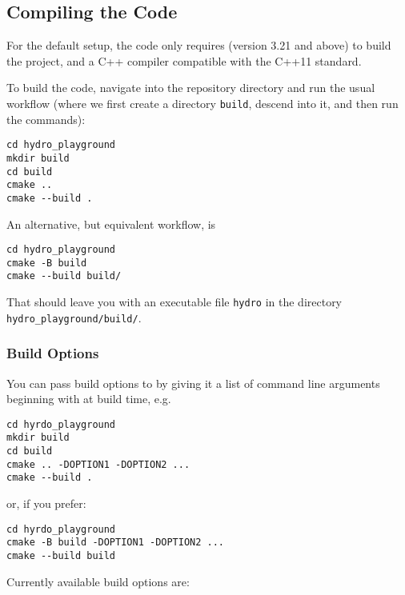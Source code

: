 \subsection{Compiling the Code}

For the default setup, the code only requires \cmake (version 3.21 and
above) to build the project, and a C++ compiler compatible with the C++11
standard.

To build the code, navigate into the repository directory and run the usual
\cmake workflow (where we first create a directory \verb|build|, descend
into it, and then run the \cmake commands):

\begin{lstlisting}
cd hydro_playground
mkdir build
cd build
cmake ..
cmake --build .
\end{lstlisting}

An alternative, but equivalent workflow, is

\begin{lstlisting}
cd hydro_playground
cmake -B build
cmake --build build/
\end{lstlisting}


That should leave you with an executable file \verb|hydro| in the directory
\verb|hydro_playground/build/|.







\subsubsection{Build Options}


You can pass build options to \cmake by giving it a list of command line
arguments beginning with  at build time, e.g.

\begin{lstlisting}
cd hyrdo_playground
mkdir build
cd build
cmake .. -DOPTION1 -DOPTION2 ...
cmake --build .
\end{lstlisting}

or, if you prefer:

\begin{lstlisting}
cd hyrdo_playground
cmake -B build -DOPTION1 -DOPTION2 ...
cmake --build build
\end{lstlisting}


Currently available build options are:

